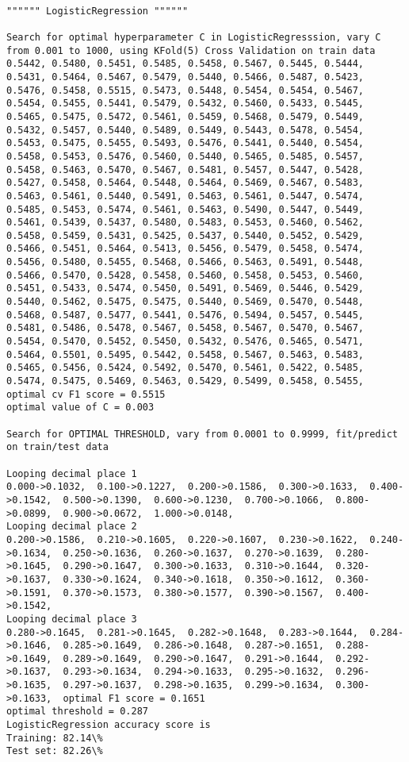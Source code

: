 \documentclass[11pt]{article}
\begin{document}
    \begin{Verbatim}[commandchars=\\\{\}]

"""""" LogisticRegression """"""

Search for optimal hyperparameter C in LogisticRegresssion, vary C from 0.001 to 1000, using KFold(5) Cross Validation on train data
0.5442, 0.5480, 0.5451, 0.5485, 0.5458, 0.5467, 0.5445, 0.5444, 0.5431, 0.5464, 0.5467, 0.5479, 0.5440, 0.5466, 0.5487, 0.5423, 0.5476, 0.5458, 0.5515, 0.5473, 0.5448, 0.5454, 0.5454, 0.5467, 0.5454, 0.5455, 0.5441, 0.5479, 0.5432, 0.5460, 0.5433, 0.5445, 0.5465, 0.5475, 0.5472, 0.5461, 0.5459, 0.5468, 0.5479, 0.5449, 0.5432, 0.5457, 0.5440, 0.5489, 0.5449, 0.5443, 0.5478, 0.5454, 0.5453, 0.5475, 0.5455, 0.5493, 0.5476, 0.5441, 0.5440, 0.5454, 0.5458, 0.5453, 0.5476, 0.5460, 0.5440, 0.5465, 0.5485, 0.5457, 0.5458, 0.5463, 0.5470, 0.5467, 0.5481, 0.5457, 0.5447, 0.5428, 0.5427, 0.5458, 0.5464, 0.5448, 0.5464, 0.5469, 0.5467, 0.5483, 0.5463, 0.5461, 0.5440, 0.5491, 0.5463, 0.5461, 0.5447, 0.5474, 0.5485, 0.5453, 0.5474, 0.5461, 0.5463, 0.5490, 0.5447, 0.5449, 0.5461, 0.5439, 0.5437, 0.5480, 0.5483, 0.5453, 0.5460, 0.5462, 0.5458, 0.5459, 0.5431, 0.5425, 0.5437, 0.5440, 0.5452, 0.5429, 0.5466, 0.5451, 0.5464, 0.5413, 0.5456, 0.5479, 0.5458, 0.5474, 0.5456, 0.5480, 0.5455, 0.5468, 0.5466, 0.5463, 0.5491, 0.5448, 0.5466, 0.5470, 0.5428, 0.5458, 0.5460, 0.5458, 0.5453, 0.5460, 0.5451, 0.5433, 0.5474, 0.5450, 0.5491, 0.5469, 0.5446, 0.5429, 0.5440, 0.5462, 0.5475, 0.5475, 0.5440, 0.5469, 0.5470, 0.5448, 0.5468, 0.5487, 0.5477, 0.5441, 0.5476, 0.5494, 0.5457, 0.5445, 0.5481, 0.5486, 0.5478, 0.5467, 0.5458, 0.5467, 0.5470, 0.5467, 0.5454, 0.5470, 0.5452, 0.5450, 0.5432, 0.5476, 0.5465, 0.5471, 0.5464, 0.5501, 0.5495, 0.5442, 0.5458, 0.5467, 0.5463, 0.5483, 0.5465, 0.5456, 0.5424, 0.5492, 0.5470, 0.5461, 0.5422, 0.5485, 0.5474, 0.5475, 0.5469, 0.5463, 0.5429, 0.5499, 0.5458, 0.5455, optimal cv F1 score = 0.5515
optimal value of C = 0.003

Search for OPTIMAL THRESHOLD, vary from 0.0001 to 0.9999, fit/predict on train/test data

Looping decimal place 1
0.000->0.1032,  0.100->0.1227,  0.200->0.1586,  0.300->0.1633,  0.400->0.1542,  0.500->0.1390,  0.600->0.1230,  0.700->0.1066,  0.800->0.0899,  0.900->0.0672,  1.000->0.0148,  
Looping decimal place 2
0.200->0.1586,  0.210->0.1605,  0.220->0.1607,  0.230->0.1622,  0.240->0.1634,  0.250->0.1636,  0.260->0.1637,  0.270->0.1639,  0.280->0.1645,  0.290->0.1647,  0.300->0.1633,  0.310->0.1644,  0.320->0.1637,  0.330->0.1624,  0.340->0.1618,  0.350->0.1612,  0.360->0.1591,  0.370->0.1573,  0.380->0.1577,  0.390->0.1567,  0.400->0.1542,  
Looping decimal place 3
0.280->0.1645,  0.281->0.1645,  0.282->0.1648,  0.283->0.1644,  0.284->0.1646,  0.285->0.1649,  0.286->0.1648,  0.287->0.1651,  0.288->0.1649,  0.289->0.1649,  0.290->0.1647,  0.291->0.1644,  0.292->0.1637,  0.293->0.1634,  0.294->0.1633,  0.295->0.1632,  0.296->0.1635,  0.297->0.1637,  0.298->0.1635,  0.299->0.1634,  0.300->0.1633,  optimal F1 score = 0.1651
optimal threshold = 0.287
LogisticRegression accuracy score is
Training: 82.14\%
Test set: 82.26\%


\end{Verbatim}
\end{document}

